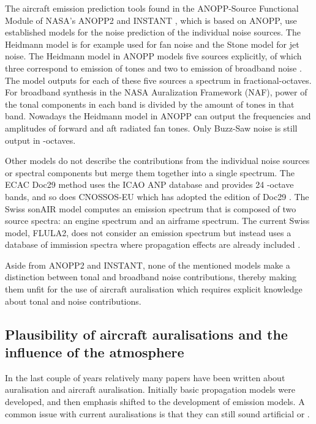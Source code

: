 
The aircraft emission prediction tools found in the ANOPP-Source Functional
Module of NASA's ANOPP2 \cite{Lopes2016, Tuttle2017} and INSTANT \cite{Sahai2016b}, which is based
on ANOPP, use established models for the noise prediction of the individual
noise sources. The Heidmann model is for example used for fan noise and the
Stone model for jet noise. The Heidmann model in ANOPP models
five sources explicitly, of which three correspond to emission of tones and two
to emission of broadband noise \cite{Arntzen2014a}. The model outputs for each
of these five sources a spectrum in fractional-octaves.
For broadband synthesis in the NASA Auralization Framework (NAF)\cite{Aumann2015}, power of the tonal
components in each band is divided by the amount of tones in that band.
Nowadays the Heidmann model in ANOPP can output the frequencies and amplitudes
of forward and aft radiated fan tones. Only Buzz-Saw noise is still output in
-octaves.


Other models do not describe the contributions from the individual noise
sources or spectral components but merge them together into a single spectrum.
The ECAC Doc29 method \cite{Doc29_fourth_2016} uses the ICAO ANP database and
provides 24 -octave bands, and so does CNOSSOS-EU which has
adopted the  edition of Doc29 \cite{Doc29_third_2005}. The Swiss sonAIR
model \cite{Zellmann2013,Zellmann2016} computes an emission spectrum that is composed of two
source spectra: an engine spectrum and an airframe spectrum. The current Swiss
model, FLULA2, does not consider an emission spectrum but instead uses a database
of immission spectra where propagation effects are already included
\cite{EMPA2010,Schaffer2014}.

Aside from ANOPP2 and INSTANT, none of the mentioned models make a distinction
between tonal and broadband noise contributions, thereby making them unfit for the use of
aircraft auralisation which requires explicit knowledge about tonal and noise
contributions.

\subsection{Plausibility of aircraft auralisations and the influence of the atmosphere}
In the last couple of years relatively many papers have been written about
auralisation and aircraft auralisation. Initially basic propagation models were
developed, and then emphasis shifted to the development of emission models. A
common issue with current auralisations is that they can still sound
artificial or  \cite{Arntzen2014a}.

